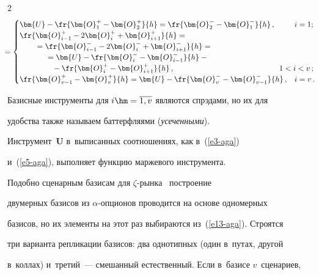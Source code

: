 \begin{multicols}{2}
\begin{multline}
  \!\!\!\!{}=\begin{cases}


  \bm{U}-\fr{\bm{O}_1^+ -\bm{O}_2^+}{h}=\fr{\bm{O}_2^- -\bm{O}_1^-}{h}\,, & i=1;\\


  \fr{\bm{O}_{i-1}^+-2\bm{O}_i^+ +\bm{O}_{i+1}^+}{h}={}&\\


  \hspace*{7mm}{}= \fr{\bm{O}^-_{i-1}-2\bm{O}_i^- +\bm{O}^-_{i+1}}{h}={}&\\


  \hspace*{12mm}{}= \bm{U}-\fr{\bm{O}_i^- -\bm{O}^-_{i-1}}{h} -{}&\\


  \hspace*{15mm}{}- \fr{\bm{O}_i^+  - \bm{O}^+_{i+1}}{h}\,, &\hspace*{-7mm} 1<i<v\,;\\


  \fr{\bm{O}^+_{v-1} -\bm{O}_v^+}{h}=\bm{U}-\fr{\bm{O}_v^- -\bm{O}^-_{v-


1}}{h}\,, & i=v\,.


  \end{cases}\!


  \label{e13-aga}


  \end{multline}


  


  Базисные инструменты для $i\hm=\overline{1,v}$ являются спрэдами, но их для 


удобства также называем баттерфляями (\textit{усеченными}). 


Инструмент~$\bm{U}$ в~выписанных соотношениях, как в~(\ref{e3-aga}) 


и~(\ref{e5-aga}),  выполняет функцию маржевого инструмента. 


  


  Подобно сценарным базисам для $\zeta$-рынка~\cite{6-aga} построение 


двумерных базисов из $\alpha$-оп\-ци\-онов проводится на основе одномерных 


базисов, но их элементы на этот раз выбираются из~(\ref{e13-aga}). Строятся 


три варианта репликации базисов: два однотипных (один в~путах, другой 


в~коллах) и~третий~--- смешанный естественный. Если в~базисе $v$~сценариев, 



\end{multicols}
